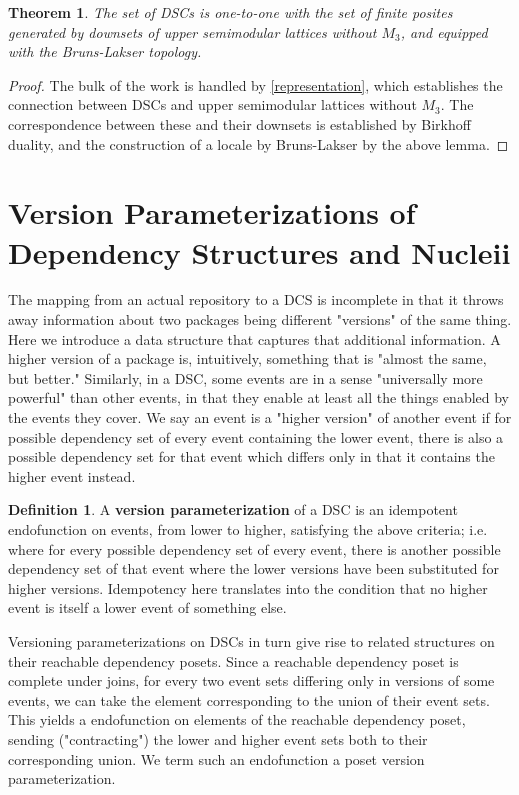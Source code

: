 \documentclass[hoptionsi,review,format=acmsmall]{acmart}
\newtheorem{theorem}{Theorem}[section]
\theoremstyle{definition}
\newtheorem{definition}{Definition}[section]
\begin{document}
\begin{theorem}
The set of DSCs is one-to-one with the set of finite posites generated by downsets of upper semimodular lattices without \(M_3\), and equipped with the Bruns-Lakser topology.
\end{theorem}
\begin{proof}
The bulk of the work is handled by \ref{representation}, which establishes the connection between DSCs and upper semimodular lattices without \(M_3\). The correspondence between these and their downsets is established by Birkhoff duality, and the construction of a locale by Bruns-Lakser by the above lemma.
\end{proof}

\section{Version Parameterizations of Dependency Structures and Nucleii}

The mapping from an actual repository to a DCS is incomplete in that it throws away information about two packages being different "versions" of the same thing. Here we introduce a data structure that captures that additional information. A higher version of a package is, intuitively, something that is "almost the same, but better." Similarly, in a DSC, some events are in a sense "universally more powerful" than other events, in that they enable at least all the things enabled by the events they cover. We say an event is a "higher version" of another event if for possible dependency set of every event containing the lower event, there is also a possible dependency set for that event which differs only in that it contains the higher event instead.

\begin{definition}
A \textbf{version parameterization} of a DSC is an idempotent endofunction on events, from lower to higher, satisfying the above criteria; i.e. where for every possible dependency set of every event, there is another possible dependency set of that event where the lower versions have been substituted for higher versions. Idempotency here translates into the condition that no higher event is itself a lower event of something else.
\end{definition}


Versioning parameterizations on DSCs in turn give rise to related structures on their reachable dependency posets. Since a reachable dependency poset is complete under joins, for every two event sets differing only in versions of some events, we can take the element corresponding to the union of their event sets. This yields a  endofunction on elements of the reachable dependency poset, sending ("contracting") the lower and higher event sets both to their corresponding union. We term such an endofunction a poset version parameterization.
\end{document}
